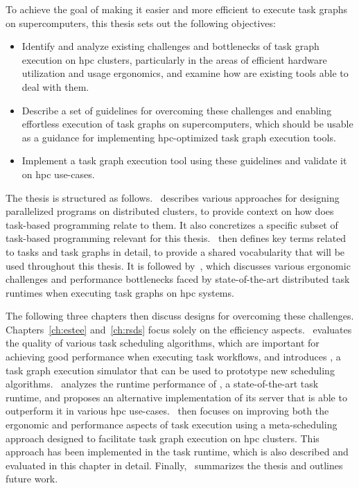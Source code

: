 To achieve the goal of making it easier and more efficient to execute task graphs on
supercomputers, this thesis sets out the following objectives:

\begin{itemize}
	\item Identify and analyze existing challenges and bottlenecks of task graph execution on
	      \gls{hpc} clusters, particularly in the areas of efficient hardware utilization and
	      usage ergonomics, and examine how are existing tools able to deal with them.
	\item Describe a set of guidelines for overcoming these challenges and enabling
	      effortless execution of task graphs on supercomputers, which should be usable
		  as a guidance for implementing \gls{hpc}-optimized task graph execution tools.
	\item Implement a task graph execution tool using these guidelines and validate it on \gls{hpc}
		  use-cases.
\end{itemize}

The thesis is structured as follows.~ describes various approaches for
designing parallelized programs on distributed clusters, to provide context on how does task-based
programming relate to them. It also concretizes a specific subset of task-based programming
relevant for this thesis.~ then defines key terms related to tasks and task
graphs in detail, to provide a shared vocabularity that will be used throughout this thesis. It is
followed by~, which discusses various ergonomic challenges and performance
bottlenecks faced by state-of-the-art distributed task runtimes when executing task graphs on
\gls{hpc} systems.

The following three chapters then discuss designs for overcoming these challenges.
Chapters~\ref{ch:estee} and~\ref{ch:rsds} focus solely on the efficiency
aspects.~ evaluates the quality of various task scheduling algorithms, which
are important for achieving good performance when executing task workflows, and introduces
\estee{}, a task graph execution simulator that can be used to prototype new
scheduling algorithms.~ analyzes the runtime performance of
\dask{}, a state-of-the-art task runtime, and proposes an alternative implementation
of its server that is able to outperform it in various \gls{hpc}
use-cases.~ then focuses on improving both the ergonomic and performance
aspects of task execution using a meta-scheduling approach designed to facilitate task graph
execution on \gls{hpc} clusters. This approach has been implemented in the
\hyperqueue{} task runtime, which is also described and evaluated in this chapter in
detail. Finally,~ summarizes the thesis and outlines future work.

